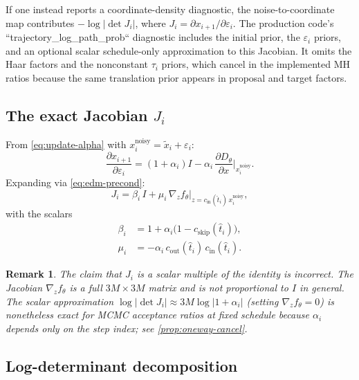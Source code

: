 \documentclass[11pt,a4paper]{article}
\newtheorem{remark}[theorem]{Remark}
\newcommand{\xtilde}{\tilde{x}}
\newcommand{\xnoisy}{x^{\mathrm{noisy}}}
\newcommand{\that}{\hat{t}}
\newcommand{\Dtheta}{D_\theta}
\newcommand{\ftheta}{f_\theta}
\newcommand{\cskip}{c_{\mathrm{skip}}}
\newcommand{\cout}{c_{\mathrm{out}}}
\newcommand{\cin}{c_{\mathrm{in}}}
\begin{document}
If one instead reports a coordinate-density diagnostic, the noise-to-coordinate
map contributes $-\log|\det J_i|$, where
$J_i = \partial x_{i+1}/\partial\varepsilon_i$.  The production code's
``trajectory_log_path_prob`` diagnostic includes the initial prior, the
$\varepsilon_i$ priors, and an optional scalar schedule-only approximation to
this Jacobian.  It omits the Haar factors and the nonconstant $\tau_i$ priors,
which cancel in the implemented MH ratios because the same translation prior
appears in proposal and target factors.

\subsection{The exact Jacobian $J_i$}
\label{sec:jacobian}

From \cref{eq:update-alpha} with $\xnoisy_i = \xtilde_i + \varepsilon_i$:
\begin{equation}
  \frac{\partial x_{i+1}}{\partial\varepsilon_i}
  = (1+\alpha_i)I - \alpha_i\,\frac{\partial\Dtheta}{\partial x}\bigg|_{\xnoisy_i}.
  \label{eq:jacobian-raw}
\end{equation}
Expanding via \cref{eq:edm-precond}:
\begin{equation}
  \boxed{
  J_i
  = \beta_i\,I + \mu_i\,\nabla_z\ftheta\bigg|_{z=\cin(\that_i)\,\xnoisy_i},
  }
  \label{eq:jacobian-exact}
\end{equation}
with the scalars
\begin{align}
  \beta_i &= 1 + \alpha_i\bigl(1 - \cskip(\that_i)\bigr),
  \label{eq:beta}\\
  \mu_i   &= -\alpha_i\,\cout(\that_i)\,\cin(\that_i).
  \label{eq:mu}
\end{align}

\begin{remark}
  The claim that $J_i$ is a scalar multiple of the identity is
  \emph{incorrect}.  The Jacobian $\nabla_z\ftheta$ is a full
  $3M\times 3M$ matrix and is not proportional to $I$ in general.
  The scalar approximation $\log|\det J_i| \approx 3M\log|1+\alpha_i|$
  (setting $\nabla_z\ftheta = 0$) is nonetheless \emph{exact for
  MCMC acceptance ratios} at fixed schedule because $\alpha_i$ depends
  only on the step index; see \cref{prop:oneway-cancel}.
\end{remark}

\subsection{Log-determinant decomposition}
\label{sec:logdet}
\end{document}
